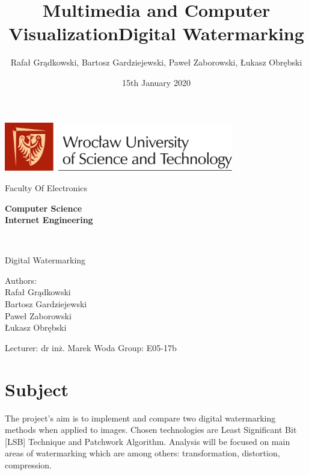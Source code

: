 \documentclass[a4paper, 12pt]{article}
\title{Multimedia and Computer Visualization}
\author{Rafał Grądkowski, Bartosz Gardziejewski, Paweł Zaborowski, Łukasz Obrębski}
\date{15th January 2020}
\begin{document}
\begin{titlepage}
    \makeatletter
    \vspace{1cm}
    \begin{center}
        \includegraphics[width=0.75\textwidth]{PWr-logo_ang.png} \par
        \vspace{0.2cm}
        \Large Faculty Of Electronics \par
        \vspace{1.25cm}
        {    
            \bfseries
            Computer Science \\
            \vspace{0.25cm}
    	    \normalsize Internet Engineering \par
    	    \vspace{2cm}
    	    \Huge \@title \\
    	}
    	\vspace{0.5cm}
        \large Digital Watermarking
    \end{center}
    \null
    \vfill
    \begin{flushright}
        Authors: \\
        Rafał Grądkowski \\
        Bartosz Gardziejewski \\
        Paweł Zaborowski \\
        Łukasz Obrębski
    \end{flushright}
    \vspace{0.5cm}
    \begin{flushleft}
        Lecturer: dr inż. Marek Woda \break
        Group: E05-17b \par
    \end{flushleft}
\end{titlepage}

\newpage
\title{Digital Watermarking}

	
\newpage
\tableofcontents

\newpage

\section{Subject}

The project's aim is to implement and compare two digital watermarking methods when applied to images. Chosen technologies are Least Significant Bit [LSB] Technique and Patchwork Algorithm.
Analysis will be focused on main areas of watermarking which are among others: transformation, distortion, compression.
\end{document}
